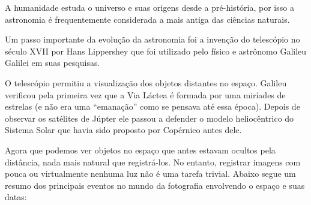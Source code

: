 \documentclass[
	article,			%
	12pt,				%
	oneside,			%
	a4paper,			%
	english,			%
	brazil,				%
	sumario=tradicional
	]{abntex2}
\begin{document}
A humanidade estuda o universo e suas origens desde a pré-história, por isso a 
astronomia é frequentemente considerada a mais antiga das ciências naturais.
~\cite{astronomiaantiga}

Um passo importante da evolução da astronomia foi a invenção do telescópio no 
século XVII por Hans Lippershey que foi utilizado pelo físico e astrônomo
Galileu Galilei em suas pesquisas.~\cite{ronan1987historia}

O telescópio permitiu a visualização dos objetos distantes no espaço. Galileu 
verificou pela primeira vez que a Via Láctea é formada por uma miríades de 
estrelas (e não era uma ``emanação'' como se pensava até essa época). Depois de
observar os satélites de Júpter ele passou a defender o modelo heliocêntrico do
Sistema Solar que havia sido proposto por Copérnico antes dele.

Agora que podemos ver objetos no espaço que antes estavam ocultos pela
distância, nada mais natural que registrá-los. No entanto, registrar imagens com
pouca ou virtualmente nenhuma luz não é uma tarefa trivial. Abaixo segue um
resumo dos principais eventos no mundo da fotografia envolvendo o espaço e suas
datas:
\end{document}
